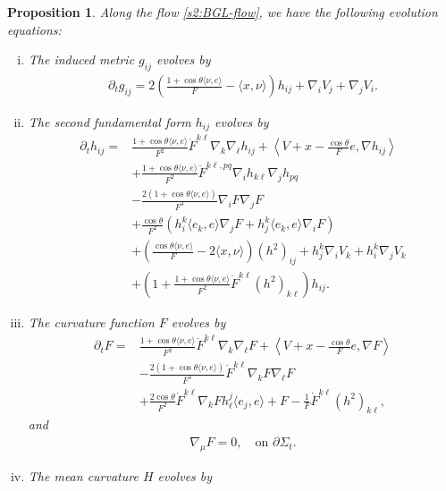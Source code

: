 \documentclass[11pt,reqno]{amsart}
\newtheorem{prop}[thm]{Proposition}
\theoremstyle{definition}
\theoremstyle{remark}
\numberwithin{equation}{section}
\renewcommand{\(}{\left(}
\renewcommand{\)}{\right)}
\renewcommand{\-}{\overline}
\renewcommand{\t}{\theta}
\begin{document}
\begin{prop}
	Along the flow \eqref{s2:BGL-flow}, we have the following evolution equations:
	\begin{enumerate}[(i)]
		\item The induced metric $g_{ij}$ evolves by
		\begin{align}\label{s3:evol-metric}
		\partial_tg_{ij}=2\(\frac{1+\cos\t\langle \nu,e\rangle}{F}-\langle x,\nu\rangle \)h_{ij}+\nabla_i V_j+\nabla_j V_i.
		\end{align}
		\item The second fundamental form $h_{ij}$ evolves by
		\begin{align}\label{s3:evol-2nd-fundamental-form}
		\partial_th_{ij}=&\frac{1+\cos\t\langle \nu,e\rangle}{F^2}\dot{F}^{k\ell}\nabla_k \nabla_\ell h_{ij}+\left\langle V+x-\frac{\cos\t}{F}e,\nabla h_{ij}\right\rangle\nonumber\\
&+\frac{1+\cos\t\langle \nu,e\rangle}{F^2}\ddot{F}^{k\ell,pq}\nabla_i h_{k\ell}\nabla_j h_{pq} \nonumber\\
		&-\frac{2(1+\cos\t\langle \nu,e\rangle)}{F^3}\nabla_iF\nabla_jF\nonumber\\
		&+\frac{\cos\theta}{F^2}\left(h_i^k\langle e_k,e\rangle \nabla_jF+h_j^k\langle e_k,e\rangle \nabla_iF\right)\nonumber\\
		&+\(\frac{\cos\t\langle \nu,e\rangle}{F}-2\langle x,\nu\rangle\) (h^2)_{ij}+h_j^k \nabla_i V_k+h_i^k\nabla_j V_k \nonumber\\
&+\(1+\frac{1+\cos\t\langle \nu,e\rangle}{F^2}\dot{F}^{k\ell}(h^2)_{k\ell}\) h_{ij}.
		\end{align}
		\item The curvature function $F$ evolves by
		\begin{align}\label{s3:evol-F}
	    \partial_t F=&\frac{1+\cos\t\langle \nu,e\rangle}{F^2}\dot{F}^{k\ell}\nabla_k\nabla_\ell F+\left\langle V+x-\frac{\cos\t}{F}e,\nabla F\right\rangle\nonumber\\
		&-\frac{2(1+\cos\t\langle \nu,e\rangle)}{F^3}\dot{F}^{k\ell}\nabla_k F\nabla_\ell F\nonumber\\
		&+\frac{2\cos\t}{F^2}\dot{F}^{k\ell}\nabla_k F h_\ell^j\langle e_j,e\rangle+F-\frac{1}{F}\dot{F}^{k\ell}(h^2)_{k\ell},
		\end{align}
		and
		\begin{align}\label{s3:bdry-F}
		\nabla_\mu F=0, \quad \text{on $\partial \Sigma_t$}.
		\end{align}
		\item The mean curvature $H$ evolves by

\end{enumerate}
\end{prop}
\end{document}
